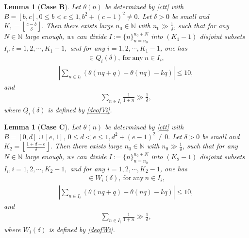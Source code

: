 \documentclass[12pt]{amsart}
\newcommand{\abs}[1]{\left\lvert #1 \right\rvert}
\theoremstyle{plain}
\newtheorem{lemma}[theorem]{Lemma}
\theoremstyle{definition}
\begin{document}
\begin{lemma}[\textbf{Case B}]\label{caseB}
  Let $\theta(n)$ be determined by \eqref{ctt} with $B=[b,c],0\leq b<c\leq 1, b^2+(c-1)^2\neq 0$. Let $\delta>0$ be small and $K_1=\left \lfloor \frac{c-b}{\delta} \right \rfloor$. Then there exists large $n_0\in\mathbb{N}$ with $n_0\gg \frac{1}{\delta}$, such that for any $N\in\mathbb{N}$ large enough, we can divide $I:=\{n\}_{n=n_0}^{n_0+N}$ into $(K_1-1)$ disjoint subsets $I_i, i=1,2,\cdots,K_1-1,$ and for any $i=1,2,\cdots,K_1-1$, one has
\begin{align}
	[\theta(nq)]\in Q_i(\delta),\ \mathrm{for\ any}\ n\in I_i,\label{aiinvitheta}
\end{align}
\begin{align}
	\abs{\sum_{n\in I_i}(\theta(nq+q)-\theta(nq)-kq)}\leq 10,\label{Iileq10theta}
\end{align}
and 
\begin{align}
\sum_{n\in I_i}\frac{1}{1+n}\gg \frac{1}{\delta},\label{Iifractionlargecasectheta}
\end{align}
where $Q_i(\delta)$ is defined by \eqref{deofVi}.
\end{lemma}
\begin{lemma}[\textbf{Case C}]\label{caseC}
 Let $\theta(n)$ be determined by \eqref{ctt} with $B=[0,d]\cup [e,1], \ 0\leq d<e\leq 1,d^2+(e-1)^2\neq0.$ Let $\delta>0$ be small and $K_2=\left \lfloor \frac{1+d-e}{\delta} \right \rfloor$. Then there exists large $n_0\in\mathbb{N}$ with $n_0\gg \frac{1}{\delta}$, such that for any $N\in\mathbb{N}$ large enough, we can divide $I:=\{n\}_{n=n_0}^{n_0+N}$ into $(K_2-1)$ disjoint subsets $I_i, i=1,2,\cdots,K_2-1,$ and for any $i=1,2,\cdots,K_2-1$, one has
\begin{align}
[\theta(nq)]\in W_i(\delta),\ \mathrm{for\ any}\ n\in I_i,\label{aiinwitheta}
\end{align}
\begin{align}
	\abs{\sum_{n\in I_i}(\theta(nq+q)-\theta(nq)-kq)}\leq 10,\label{Iileq10casedtheta}
\end{align}
and 
\begin{align}
\sum_{n\in I_i}\frac{1}{1+n}\gg \frac{1}{\delta},\label{Iifractionlargecasedtheta}
\end{align}
where $W_i(\delta)$ is defined by \eqref{deofWi}.
\end{lemma}
\end{document}

